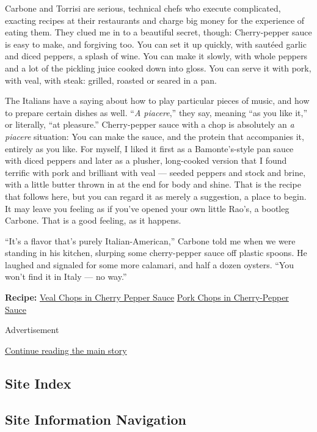 Carbone and Torrisi are serious, technical chefs who execute
complicated, exacting recipes at their restaurants and charge big money
for the experience of eating them. They clued me in to a beautiful
secret, though: Cherry-pepper sauce is easy to make, and forgiving too.
You can set it up quickly, with sautéed garlic and diced peppers, a
splash of wine. You can make it slowly, with whole peppers and a lot of
the pickling juice cooked down into gloss. You can serve it with pork,
with veal, with steak: grilled, roasted or seared in a pan.

The Italians have a saying about how to play particular pieces of music,
and how to prepare certain dishes as well. ``\emph{A piacere},'' they
say, meaning ``as you like it,'' or literally, ``at pleasure.''
Cherry-pepper sauce with a chop is absolutely an \emph{a piacere}
situation: You can make the sauce, and the protein that accompanies it,
entirely as you like. For myself, I liked it first as a Bamonte's-style
pan sauce with diced peppers and later as a plusher, long-cooked version
that I found terrific with pork and brilliant with veal --- seeded
peppers and stock and brine, with a little butter thrown in at the end
for body and shine. That is the recipe that follows here, but you can
regard it as merely a suggestion, a place to begin. It may leave you
feeling as if you've opened your own little Rao's, a bootleg Carbone.
That is a good feeling, as it happens.

``It's a flavor that's purely Italian-American,'' Carbone told me when
we were standing in his kitchen, slurping some cherry-pepper sauce off
plastic spoons. He laughed and signaled for some more calamari, and half
a dozen oysters. ``You won't find it in Italy --- no way.''

\textbf{Recipe:}
\href{https://cooking.nytimes3xbfgragh.onion/recipes/1020700-veal-chops-in-cherry-pepper-sauce}{Veal
Chops in Cherry Pepper Sauce} \textbar{}
\href{https://cooking.nytimes3xbfgragh.onion/recipes/1020701-pork-chops-in-cherry-pepper-sauce}{Pork
Chops in Cherry-Pepper Sauce}

Advertisement

\protect\hyperlink{after-bottom}{Continue reading the main story}

\hypertarget{site-index}{%
\subsection{Site Index}\label{site-index}}

\hypertarget{site-information-navigation}{%
\subsection{Site Information
Navigation}\label{site-information-navigation}}

